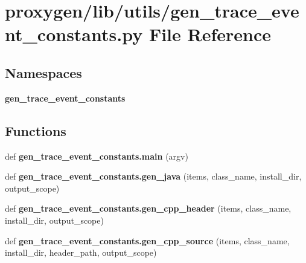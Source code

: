 \section{proxygen/lib/utils/gen\+\_\+trace\+\_\+event\+\_\+constants.py File Reference}
\label{gen__trace__event__constants_8py}
\subsection*{Namespaces}
\begin{DoxyCompactItemize}
\item 
 {\bf gen\+\_\+trace\+\_\+event\+\_\+constants}
\end{DoxyCompactItemize}
\subsection*{Functions}
\begin{DoxyCompactItemize}
\item 
def {\bf gen\+\_\+trace\+\_\+event\+\_\+constants.\+main} (argv)
\item 
def {\bf gen\+\_\+trace\+\_\+event\+\_\+constants.\+gen\+\_\+java} (items, class\+\_\+name, install\+\_\+dir, output\+\_\+scope)
\item 
def {\bf gen\+\_\+trace\+\_\+event\+\_\+constants.\+gen\+\_\+cpp\+\_\+header} (items, class\+\_\+name, install\+\_\+dir, output\+\_\+scope)
\item 
def {\bf gen\+\_\+trace\+\_\+event\+\_\+constants.\+gen\+\_\+cpp\+\_\+source} (items, class\+\_\+name, install\+\_\+dir, header\+\_\+path, output\+\_\+scope)
\end{DoxyCompactItemize}
